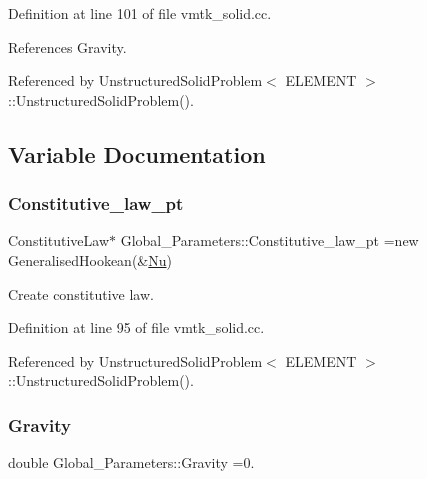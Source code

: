 Definition at line 101 of file vmtk\+\_\+solid.\+cc.



References Gravity.



Referenced by Unstructured\+Solid\+Problem$<$ E\+L\+E\+M\+E\+N\+T $>$\+::\+Unstructured\+Solid\+Problem().



\subsection{Variable Documentation}
\mbox{\label{namespaceGlobal__Parameters_adbd1f040f375c96fe56b3f475f7dbec2}} 
\subsubsection{\texorpdfstring{Constitutive\+\_\+law\+\_\+pt}{Constitutive\_law\_pt}}
{\footnotesize\ttfamily Constitutive\+Law$\ast$ Global\+\_\+\+Parameters\+::\+Constitutive\+\_\+law\+\_\+pt =new Generalised\+Hookean(\&\hyperlink{namespaceGlobal__Parameters_a20fccdcfa2c15ad8b951b9ada3bb1661}{Nu})}



Create constitutive law. 



Definition at line 95 of file vmtk\+\_\+solid.\+cc.



Referenced by Unstructured\+Solid\+Problem$<$ E\+L\+E\+M\+E\+N\+T $>$\+::\+Unstructured\+Solid\+Problem().

\mbox{\label{namespaceGlobal__Parameters_a335000b5db4206486a116ae0468d2d0c}} 
\subsubsection{\texorpdfstring{Gravity}{Gravity}}
{\footnotesize\ttfamily double Global\+\_\+\+Parameters\+::\+Gravity =0.}



